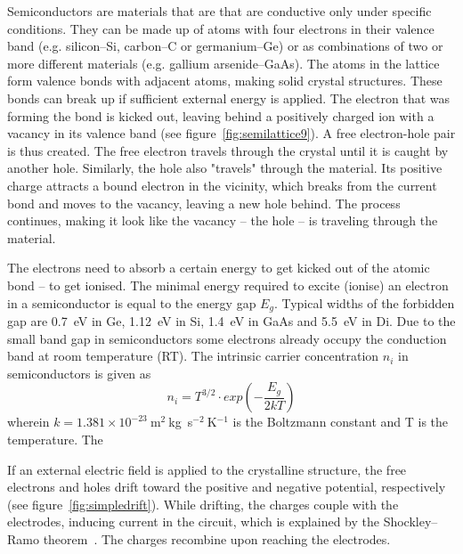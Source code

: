 \documentclass[12pt]{mytustyle}  %
\begin{document}
Semiconductors are materials that are that are conductive only under specific conditions. They can be made up of atoms with four electrons in their valence band (e.g. silicon--Si, carbon--C or germanium--Ge) or as combinations of two or more different materials (e.g. gallium arsenide--GaAs). The atoms in the lattice form valence bonds with adjacent atoms, making solid crystal structures. These bonds can break up if sufficient external energy is applied. The electron that was forming the bond is kicked out, leaving behind a positively charged ion with a vacancy in its valence band (see figure~\ref{fig:semilattice9}). A free electron-hole pair is thus created. The free electron travels through the crystal until it is caught by another hole. Similarly, the hole also "travels" through the material. Its positive charge attracts a bound electron in the vicinity, which breaks from the current bond and moves to the vacancy, leaving a new hole behind. The process continues, making it look like the vacancy -- the hole -- is traveling through the material.




The electrons need to absorb a certain energy to get kicked out of the atomic bond -- to get ionised. The minimal energy required to excite (ionise) an electron in a semiconductor is equal to the energy gap $E_g$. Typical widths of the forbidden gap are 0.7~eV in Ge, 1.12~eV in Si, 1.4~eV in GaAs and 5.5~eV in Di. Due to the small band gap in semiconductors some electrons already occupy the conduction band at room temperature (RT). The intrinsic carrier concentration $n_i$ in semiconductors is given as
\begin{equation}
\label{eq:intrinsiccarrier}
n_i = T^{3/2} \cdot exp(-\frac{E_g}{2kT}) 
\end{equation} 
wherein $k = 1.381\times10^{-23}~$m$^2~$kg~s$^{-2}~$K$^{-1}$ is the Boltzmann constant and T is the temperature. The 

If an external electric field is applied to the crystalline structure, the free electrons and holes drift toward the positive and negative potential, respectively (see figure~\ref{fig:simpledrift}). While drifting, the charges couple with the electrodes, inducing current in the circuit, which is explained by the Shockley--Ramo theorem~\cite{}. The charges recombine upon reaching the electrodes.
\end{document}

